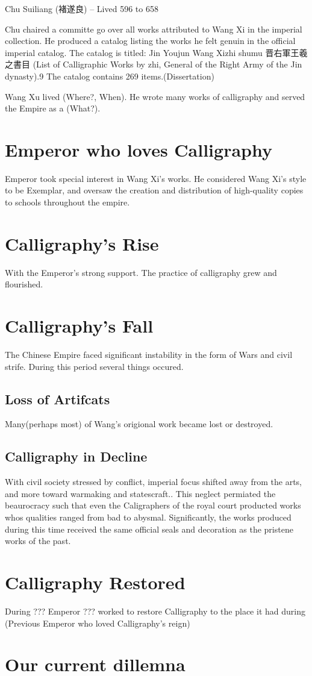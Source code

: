 Chu Suiliang (褚遂良) -- Lived 596 to 658


Chu chaired a committe go over all works attributed to Wang Xi in the imperial collection.  He produced a catalog listing the works he felt genuin in the official imperial catalog.  The catalog is titled: 
Jin Youjun Wang Xizhi shumu 晋右軍王羲之書目 (List of Calligraphic Works by zhi, General of the Right Army of the Jin dynasty).9 The catalog contains 269 items.(Dissertation)


Wang Xu lived (Where?, When).  He wrote many works of calligraphy and served the Empire as a (What?).  

\section{Emperor who loves Calligraphy}

Emperor took special interest in Wang Xi's works.  He considered Wang Xi's style to be Exemplar, and oversaw the creation and distribution of high-quality copies to schools throughout the empire.

\section{Calligraphy's Rise}

With the Emperor's strong support. The practice of calligraphy grew and flourished.

\section{Calligraphy's Fall}

The Chinese Empire faced significant instability in the form of Wars and civil strife.  During this period several things occured.

\subsection{Loss of Artifcats}

Many(perhaps most) of Wang's origional work became lost or destroyed.

\subsection{Calligraphy in Decline}

With civil society stressed by conflict, imperial focus shifted away from the arts, and more toward warmaking and statescraft..  This neglect permiated the beaurocracy such that even the Caligraphers of the royal court producted works whos qualities ranged from bad to abysmal.  Significantly, the works produced during this time received the same official seals and decoration as the pristene works of the past.

\section{Calligraphy Restored}

During ??? Emperor ??? worked to restore Calligraphy to the place it had during (Previous Emperor who loved Calligraphy's reign)


\section{Our current dillemna}




